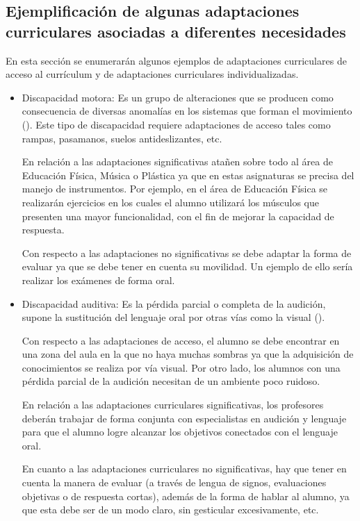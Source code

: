 \subsection{Ejemplificación de algunas adaptaciones curriculares asociadas a diferentes necesidades }

En esta sección se enumerarán algunos ejemplos de adaptaciones curriculares de acceso al currículum y de adaptaciones curriculares individualizadas.

\begin{itemize}
    \item Discapacidad motora: Es un grupo de alteraciones que se producen como consecuencia de diversas anomalías en los sistemas que forman el movimiento (\citeauthor{disMotora}). Este tipo de discapacidad requiere  adaptaciones de acceso tales como rampas, pasamanos, suelos antideslizantes, etc.

          En relación a las adaptaciones significativas atañen sobre todo al área de Educación Física, Música o Plástica ya que en estas asignaturas se precisa del manejo de instrumentos. Por ejemplo, en el área de Educación Física se realizarán ejercicios en los cuales el alumno utilizará los músculos que presenten una mayor funcionalidad, con el fin de mejorar la capacidad de respuesta.

          Con respecto a las adaptaciones no significativas se debe adaptar la forma de evaluar ya que se debe tener en cuenta su movilidad. Un ejemplo de ello sería realizar los exámenes de forma oral.

    \item Discapacidad auditiva: Es la pérdida parcial o completa de la audición, supone la sustitución del lenguaje oral por otras vías como la visual (\citeauthor{disAuditiva}).

          Con respecto a las adaptaciones de acceso, el alumno se debe encontrar en una zona del aula en la que no haya muchas sombras ya que la adquisición de conocimientos se realiza por vía visual. Por otro lado, los alumnos con una pérdida parcial de la audición necesitan de un ambiente poco ruidoso.

          En relación a las adaptaciones curriculares significativas, los profesores deberán trabajar de forma conjunta con especialistas en audición y lenguaje para que el alumno logre alcanzar los objetivos conectados con el lenguaje oral.

          En cuanto a las adaptaciones curriculares no significativas, hay que tener en cuenta la manera de evaluar (a través de lengua de signos, evaluaciones objetivas o de respuesta cortas), además de la forma de hablar al alumno, ya que esta debe ser de un modo claro, sin gesticular excesivamente, etc.


\end{itemize}
